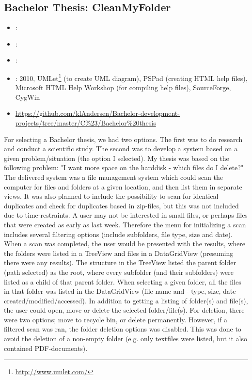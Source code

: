 \subsection{Bachelor Thesis: CleanMyFolder}
\label{sec:bach_thesis}
\begin{itemize} 
	\item {}: 
	\item {}: 
	\item {}: 
	\item {}:  2010, UMLet\footnote{\url{http://www.umlet.com/}} (to create UML diagram), 
	PSPad (creating HTML help files),  Microsoft HTML Help Workshop (for compiling help files), SourceForge, CygWin
	\item {} \url{https://github.com/klAndersen/Bachelor-development-projects/tree/master/C%23/Bachelor%20thesis}
\end{itemize} 
For selecting a Bachelor thesis, we had two options. 
The first was to do research and conduct a scientific study. 
The second was to develop a system based on a given problem/situation (the option I selected).
My thesis was based on the following problem: "I want more space on the harddisk - which files do I delete?" 
\vspace{0.5em}\newline
The delivered system was a file management system which could scan the computer for files and folders at a given location, and then list them in separate views. 
It was also planned to include the possibility to scan for identical duplicates and check for duplicates based in zip-files, but this was not included due to time-restraints.
\vspace{0.5em}\newline
A user may not be interested in small files, or perhaps files that were created as early as last week. 
Therefore the menu for initializing a scan includes several filtering options (include subfolders, file type, size and date).
When a scan was completed, the user would be presented with the results, where the folders were listed in a TreeView and files in a DataGridView (presuming there were any results).
The structure in the TreeView listed the parent folder (path selected) as the root, where every subfolder (and their subfolders) were listed as a child of that parent folder.
When selecting a given folder, all the files in that folder was listed in the DataGridView (file name and - type, size, date created/modified/accessed).
\vspace{0.5em}\newline
In addition to getting a listing of folder(s) and file(s), the user could open, move or delete the selected folder/file(s). 
For deletion, there were two options; move to recycle bin, or delete permanently. 
However, if a filtered scan was ran, the folder deletion options was disabled. 
This was done to avoid the deletion of a non-empty folder (e.g. only textfiles were listed, but it also contained PDF-documents).

